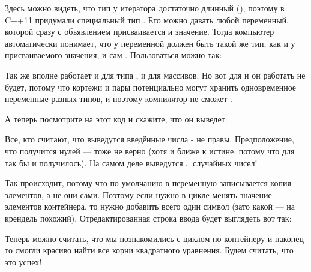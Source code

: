 
Здесь можно видеть, что тип у итератора достаточно длинный (), поэтому в C++11 придумали специальный тип . Его можно давать любой переменный, которой сразу с объявлением присваивается и значение. Тогда компьютер автоматически понимает, что у переменной должен быть такой же тип, как и у присваиваемого значения, и сам . Пользоваться  можно так:


Так же  вполне работает и для типа , и для массивов. Но вот для  и  он работать не будет, потому что кортежи и пары потенциально могут хранить одновременное переменные разных типов, и поэтому компилятор не сможет .

А теперь посмотрите на этот код и скажите, что он выведет:


Все, кто считают, что выведутся введённые числа - не правы. Предположение, что получится  нулей — тоже не верно (хотя и ближе к истине, потому что для  так бы и получилось). На самом деле выведутся...  случайных чисел!

Так происходит, потому что по умолчанию в переменную  записывается копия элементов, а не они сами. Поэтому если нужно в цикле менять значение элементов контейнера, то нужно добавить всего один символ \lcpp{&} (зато какой — на крендель похожий). Отредактированная строка ввода будет выглядеть вот так:


Теперь можно считать, что мы познакомились с циклом по контейнеру и наконец-то смогли красиво найти все корни квадратного уравнения. Будем считать, что это успех!

